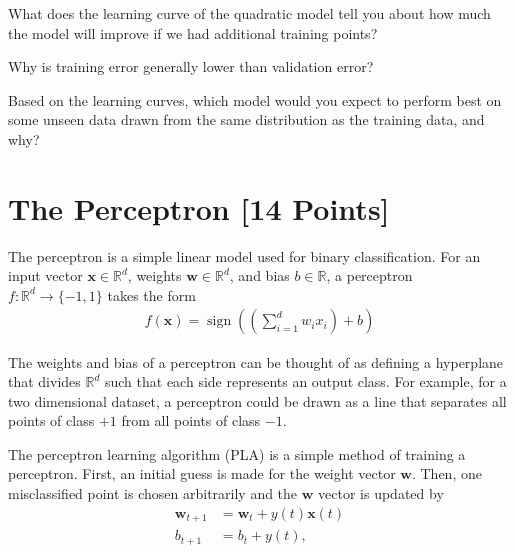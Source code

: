 \begin{problem}[3]
What does the learning curve of the quadratic model tell you about how much the model will improve if we had additional training points?
\end{problem}
\begin{solution}

\end{solution}

\begin{problem}[3]
Why is training error generally lower than validation error?
\end{problem}
\begin{solution}

\end{solution}

\begin{problem}[3]
Based on the learning curves, which model would you expect to perform best on some unseen data drawn from the same distribution as the training data, and why?
\end{problem}
\begin{solution}

\end{solution}





\newpage
\section{The Perceptron [14 Points]}

The perceptron is a simple linear model used for binary classification.
For an input vector $\mathbf{x} \in \mathbb{R}^d$, weights $\mathbf{w} \in \mathbb{R}^d$, and bias $b \in \mathbb{R}$, a perceptron $f: \mathbb{R}^d \rightarrow \{-1,1\}$ takes the form
\begin{align*}
	f(\mathbf{x}) = \operatorname{sign}\left(\left(\sum_{i=1}^d w_i x_i\right) + b \right)
\end{align*}

The weights and bias of a perceptron can be thought of as defining a hyperplane that divides $\mathbb{R}^d$ such that each side represents an output class. For example, for a two dimensional dataset, a perceptron could be drawn as a line that separates all points of class $+1$ from all points of class $-1$.

The perceptron learning algorithm (PLA) is a simple method of training a perceptron.
First, an initial guess is made for the weight vector $\mathbf{w}$.
Then, one misclassified point is chosen arbitrarily and the $\mathbf{w}$ vector is updated by
\begin{align*}
	\mathbf{w}_{t+1} & = \mathbf{w}_t + y(t)\mathbf{x}(t) \\
	b_{t + 1}        & = b_t + y(t),
\end{align*}


